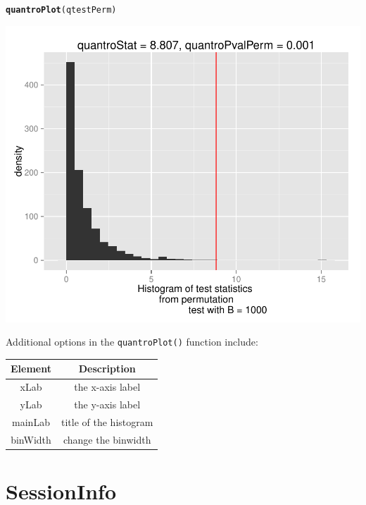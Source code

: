 \documentclass{article}\usepackage[]{graphicx}\usepackage[usenames,dvipsnames]{color}
\makeatletter
\def\maxwidth{ %
  \ifdim\Gin@nat@width>\linewidth
    \linewidth
  \else
    \Gin@nat@width
  \fi
}
\newcommand{\hlstd}[1]{\textcolor[rgb]{0.345,0.345,0.345}{#1}}%
\newcommand{\hlkwd}[1]{\textcolor[rgb]{0.737,0.353,0.396}{\textbf{#1}}}%
\newenvironment{kframe}{%
 \def\at@end@of@kframe{}%
 \ifinner\ifhmode%
  \def\at@end@of@kframe{\end{minipage}}%
  \begin{minipage}{\columnwidth}%
 \fi\fi%
 \def\FrameCommand##1{\hskip\@totalleftmargin \hskip-\fboxsep
 \colorbox{shadecolor}{##1}\hskip-\fboxsep
     \hskip-\linewidth \hskip-\@totalleftmargin \hskip\columnwidth}%
 \MakeFramed {\advance\hsize-\width
   \@totalleftmargin\z@ \linewidth\hsize
   \@setminipage}}%
 {\par\unskip\endMakeFramed%
 \at@end@of@kframe}
\newenvironment{knitrout}{}{} %
\makeatother
\begin{document}
\begin{knitrout}
\color{fgcolor}\begin{kframe}
\begin{alltt}
\hlkwd{quantroPlot}\hlstd{(qtestPerm)}
\end{alltt}
\end{kframe}
\includegraphics[width=\maxwidth]{figure/quantro-plot-1} 

\end{knitrout}


Additional options in the \texttt{quantroPlot()} function include:

\begin{table}[h]
\begin{center}
\begin{tabular}{|c|c|}
\hline
Element & Description \\
\hline
xLab & the x-axis label \\
yLab & the y-axis label \\
mainLab & title of the histogram \\
binWidth & change the binwidth \\
\hline
\end{tabular}
\end{center}
\label{tab:plots}
\end{table}


\section{SessionInfo}
\end{document}
